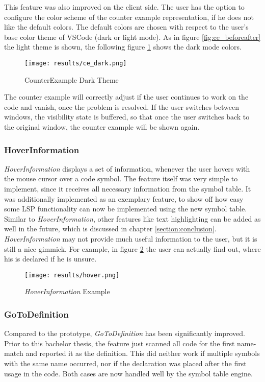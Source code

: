 This feature was also improved on the client side.
The user has the option to configure the color scheme of the counter example representation, if he does not like the default colors.
The default colors are chosen with respect to the user's base color theme of VSCode (dark or light mode).
As in figure \ref{fig:ce_beforeafter} the light theme is shown,
the following figure \ref{fig:ce_dark} shows the dark mode colors.

\begin{figure}[H]
    \centering
    \texttt{[image: results/ce\_dark.png]}
    \caption{CounterExample Dark Theme}
    \label{fig:ce_dark}
\end{figure}

The counter example will correctly adjust if the user continues to work on the code and vanish, once the problem is resolved.
If the user switches between windows, the visibility state is buffered, so that once the user switches back to the original window, the counter example will be shown again.

\subsubsection{HoverInformation}
\textit{HoverInformation} displays a set of information, whenever the user hovers with the mouse cursor over a code symbol.
The feature itself was very simple to implement, since it receives all necessary information from the symbol table.
It was additionally implemented as an exemplary feature, to show off how easy some LSP functionality can now be implemented using the new symbol table.
Similar to \textit{HoverInformation}, other features like text highlighting can be added as well in the future, which is discussed in chapter \ref{section:conclusion}.
\textit{HoverInformation} may not provide much useful information to the user, but it is still a nice gimmick.
For example, in figure \ref{fig:hover} the user can actually find out, where his  is declared if he is unsure.
\begin{figure}[H]
    \centering
    \texttt{[image: results/hover.png]}
    \caption{\textit{HoverInformation} Example}
    \label{fig:hover}
\end{figure}

\subsubsection{GoToDefinition}
Compared to the prototype, \textit{GoToDefinition} has been significantly improved.
Prior to this bachelor thesis, the feature just scanned all code for the first name-match and reported it as the definition.
This did neither work if multiple symbols with the same name occurred, nor if the declaration was placed after the first usage in the code.
Both cases are now handled well by the symbol table engine.\\


